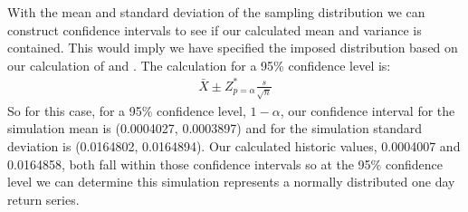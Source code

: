 \documentclass[letterpaper,10pt,english]{sphinxmanual}
\begin{document}
\begin{sphinxVerbatim}[commandchars=\\\{\}]
  \PYG{p}{[}    \PYG{p}{]}
    
 
 
 
\end{sphinxVerbatim}

\sphinxAtStartPar
With the mean and standard deviation of the sampling distribution we can
construct confidence intervals to see if our calculated mean and
variance is contained. This would imply we have specified the imposed
distribution based on our calculation of  and
. The calculation for a 95\% confidence level is:
\begin{equation*}
\begin{split}\bar{X} \pm Z^{*}_{p=\alpha} \frac{s}{\sqrt{n}}\end{split}
\end{equation*}
\sphinxAtStartPar
So for this case, for a 95\% confidence level, \(1-\alpha\), our
confidence interval for the simulation mean is (\sphinxhyphen{}0.0004027, \sphinxhyphen{}0.0003897)
and for the simulation standard deviation is (0.0164802, 0.0164894). Our
calculated historic values, \sphinxhyphen{}0.0004007 and 0.0164858, both fall within
those confidence intervals so at the 95\% confidence level we can
determine this simulation represents a normally distributed one day
return series.
\end{document}
